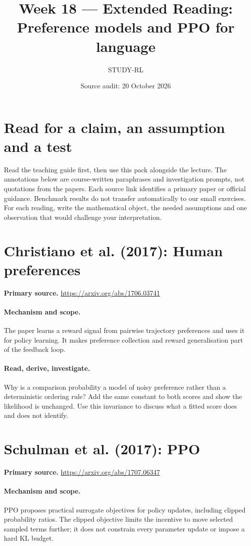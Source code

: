 \documentclass[11pt]{scrartcl}
\title{Week 18 --- Extended Reading: Preference models and PPO for language}
\author{STUDY-RL}
\date{Source audit: 20 October 2026}
\begin{document}
\maketitle
\section*{Read for a claim, an assumption and a test}
Read the teaching guide first, then use this pack alongside the lecture.
The annotations below are course-written paraphrases and investigation prompts,
not quotations from the papers. Each source link identifies a primary paper
or official guidance. Benchmark results do not transfer automatically to our
small exercises. For each reading, write the mathematical object, the needed
assumptions and one observation that would challenge your interpretation.

\section{Christiano et al. (2017): Human preferences}
\noindent\textbf{Primary source.} \url{https://arxiv.org/abs/1706.03741}

\paragraph{Mechanism and scope.} The paper learns a reward signal from pairwise trajectory preferences and uses it for policy learning. It makes preference collection and reward generalisation part of the feedback loop.

\paragraph{Read, derive, investigate.} Why is a comparison probability a model of noisy preference rather than a deterministic ordering rule? Add the same constant to both scores and show the likelihood is unchanged. Use this invariance to discuss what a fitted score does and does not identify.

\section{Schulman et al. (2017): PPO}
\noindent\textbf{Primary source.} \url{https://arxiv.org/abs/1707.06347}

\paragraph{Mechanism and scope.} PPO proposes practical surrogate objectives for policy updates, including clipped probability ratios. The clipped objective limits the incentive to move selected sampled terms further; it does not constrain every parameter update or impose a hard KL budget.
\end{document}
